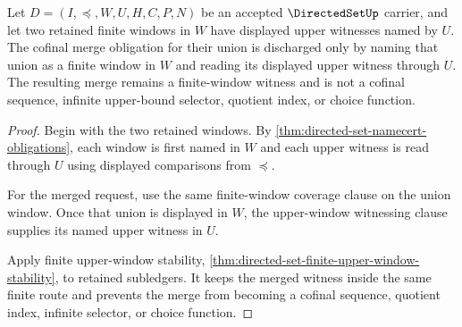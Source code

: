 \begin{theorem}
\label{thm:directedset-cofinal-merge-obligation}
Let $D=(I,\preceq,W,U,H,C,P,N)$ be an accepted $\DirectedSetUp$ carrier, and let two retained finite windows in $W$ have displayed upper witnesses named by $U$. The cofinal merge obligation for their union is discharged only by naming that union as a finite window in $W$ and reading its displayed upper witness through $U$. The resulting merge remains a finite-window witness and is not a cofinal sequence, infinite upper-bound selector, quotient index, or choice function.
\end{theorem}
\begin{proof}
Begin with the two retained windows. By \autoref{thm:directed-set-namecert-obligations}, each window is first named in $W$ and each upper witness is read through $U$ using displayed comparisons from $\preceq$.

For the merged request, use the same finite-window coverage clause on the union window. Once that union is displayed in $W$, the upper-window witnessing clause supplies its named upper witness in $U$.

Apply finite upper-window stability, \autoref{thm:directed-set-finite-upper-window-stability}, to retained subledgers. It keeps the merged witness inside the same finite route and prevents the merge from becoming a cofinal sequence, quotient index, infinite selector, or choice function.
\end{proof}

